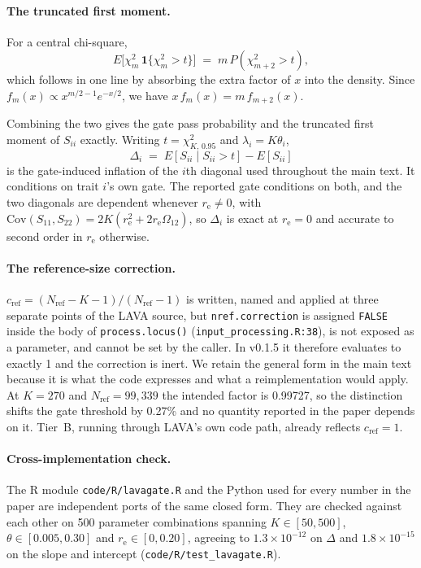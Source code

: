 \documentclass[11pt,a4paper]{article}
\newcommand{\re}{r_{\mathrm{e}}}
\newcommand{\crf}{c_{\mathrm{ref}}}
\newcommand{\Nref}{N_{\mathrm{ref}}}
\begin{document}
\paragraph{The truncated first moment.} For a central chi-square,
\begin{equation}
E\bigl[\chi^2_m\,\mathbf{1}\{\chi^2_m > t\}\bigr] \;=\; m\,P(\chi^2_{m+2} > t),
\end{equation}
which follows in one line by absorbing the extra factor of $x$ into the density. Since
$f_m(x)\propto x^{m/2-1}e^{-x/2}$, we have $x\,f_m(x) = m\,f_{m+2}(x)$.

Combining the two gives the gate pass probability and the truncated first moment of
$S_{ii}$ exactly. Writing $t=\chi^2_{K,\,0.95}$ and $\lambda_i = K\theta_i$,
\begin{equation}
\Delta_i \;=\; E[S_{ii}\mid S_{ii}>t] - E[S_{ii}]
\end{equation}
is the gate-induced inflation of the $i$th diagonal used throughout the main text.
It conditions on trait $i$'s own gate. The reported gate conditions on both, and the
two diagonals are dependent whenever $\re\neq0$, with
$\mathrm{Cov}(S_{11},S_{22})=2K(\re^2+2\re\Omega_{12})$, so $\Delta_i$ is exact at
$\re=0$ and accurate to second order in $\re$ otherwise.

\paragraph{The reference-size correction.} $\crf = (\Nref-K-1)/(\Nref-1)$ is written, named
and applied at three separate points of the LAVA source, but \texttt{nref.correction} is
assigned \texttt{FALSE} inside the body of \texttt{process.locus()}
(\texttt{input\_processing.R:38}), is not exposed as a parameter, and cannot be set by the
caller. In v0.1.5 it therefore evaluates to exactly 1 and the correction is inert. We
retain the general form in the main text because it is what the code expresses and what a
reimplementation would apply. At $K=270$ and $\Nref=99{,}339$ the intended factor is
0.99727, so the distinction shifts the gate threshold by 0.27\% and no quantity reported
in the paper depends on it. Tier~B, running through LAVA's own code path, already reflects
$\crf = 1$.

\paragraph{Cross-implementation check.} The R module \texttt{code/R/lavagate.R} and the
Python used for every number in the paper are independent ports of the same closed form.
They are checked against each other on 500 parameter combinations spanning
$K\in[50,500]$, $\theta\in[0.005,0.30]$ and $\re\in[0,0.20]$, agreeing to
$1.3\times10^{-12}$ on $\Delta$ and $1.8\times10^{-15}$ on the slope and intercept
(\texttt{code/R/test\_lavagate.R}).
\end{document}
